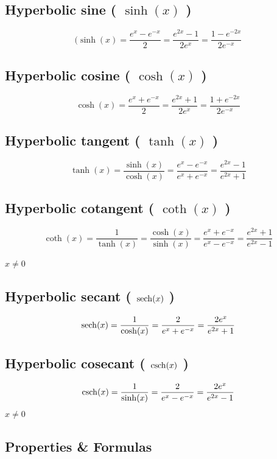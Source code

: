 \subsection{Hyperbolic sine ( $\sinh(x)$ ) }\label{sinh}
\[
    (\sinh(x) = {\displaystyle\frac{e^{x} - e^{-x}}{2}}={\displaystyle\frac{e^{2x} - 1}{2e^{x}}}={\displaystyle\frac{1 - e^{-2x}}{2e^{-x}}}
\]

\subsection{Hyperbolic cosine ( $\cosh(x)$ ) }\label{cosh}
\[
    \cosh(x) = {\displaystyle\frac{e^{x} + e^{-x}}{2}} = {\displaystyle\frac{e^{2x} + 1}{2e^{x}}} = {\displaystyle\frac{1 + e^{-2x}}{2e^{-x}}}
\]

\subsection{Hyperbolic tangent ( $\tanh(x)$ )}\label{tanh}
\[
    \tanh(x) = \displaystyle\frac{\sinh(x)}{\cosh(x)} = \displaystyle\frac{e^{x} - e^{-x}}{e^{x} + e^{-x}} = \displaystyle\frac{e^{2x} - 1}{e^{2x} + 1}
\]

\subsection{Hyperbolic cotangent ( $\coth(x)$ )}\label{coth}
\[
    \coth(x) = \displaystyle\frac{1}{\tanh(x)} = \displaystyle\frac{\cosh(x)}{\sinh(x)} = \displaystyle\frac{e^{x} + e^{-x}}{e^{x} - e^{-x}} = \displaystyle\frac{e^{2x} + 1}{e^{2x} - 1}
\]

$x \neq 0$

\subsection{Hyperbolic secant ( $\operatorname{sech}(x)$ )} \label{sech}
\[
    \operatorname{sech}(x) = \displaystyle\frac{1}{\cosh(x)} = \displaystyle\frac{2}{e^{x} + e^{-x}} = \displaystyle\frac{2e^{x}}{e^{2x} + 1}
\]

\subsection{Hyperbolic cosecant ( $\operatorname{csch}(x)$ )}\label{csch}
\[
    \operatorname{csch}(x) = \displaystyle\frac{1}{\sinh(x)} = \displaystyle\frac{2}{e^{x} - e^{-x}} = \displaystyle\frac{2e^{x}}{e^{2x} - 1}
\]
$x \neq 0$

\subsection{Properties \& Formulas}

